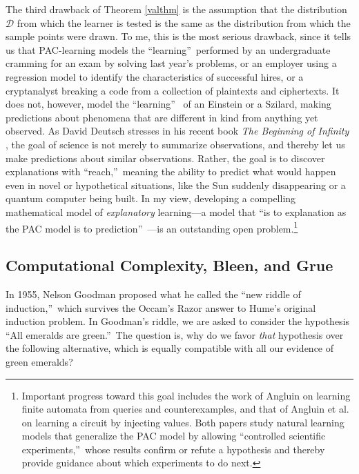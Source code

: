 \documentclass[12pt,onecolumn]{article}%
\begin{document}
The third drawback of Theorem \ref{valthm} is the assumption that the
distribution $\mathcal{D}$ from which the learner is tested is the same as
the distribution from which the sample points were drawn. To me, this is the
most serious drawback, since it tells us that PAC-learning models the
\textquotedblleft learning\textquotedblright\  performed by an undergraduate
cramming for an exam by solving last year's problems, or an employer using a
regression model to identify the characteristics of successful hires, or a
cryptanalyst breaking a code from a collection of plaintexts and ciphertexts.
 It does not, however, model the \textquotedblleft learning\textquotedblright\ %
 of an Einstein or a Szilard, making predictions about phenomena that are
different in kind from anything yet observed. As David Deutsch stresses in
his recent book \textit{The Beginning of Infinity} \cite{deutsch:infinity},
the goal of science is not merely to summarize observations, and thereby let
us make predictions about similar observations. Rather, the goal is to
discover explanations with \textquotedblleft reach,\textquotedblright\  meaning
the ability to predict what would happen even in novel or hypothetical
situations, like the Sun suddenly disappearing or a quantum computer being
built. In my view, developing a compelling mathematical model of
\textit{explanatory} learning---a model that \textquotedblleft is to
explanation as the PAC model is to prediction\textquotedblright\ ---is an
outstanding open problem.\footnote{Important progress toward this goal
includes the work of Angluin \cite{angluin} on learning finite automata from
queries and counterexamples, and that of Angluin et al. \cite{aacw} on
learning a circuit by injecting values. Both papers study natural learning
models that generalize the PAC model by allowing \textquotedblleft controlled
scientific experiments,\textquotedblright\  whose results confirm or refute a
hypothesis and thereby provide guidance about which experiments to do next.}

\subsection{Computational Complexity, Bleen, and Grue\label{GRUE}}

In 1955, Nelson Goodman \cite{goodman} proposed what he called the
\textquotedblleft new riddle of induction,\textquotedblright\  which survives
the Occam's Razor answer to Hume's original induction problem. In Goodman's
riddle, we are asked to consider the hypothesis \textquotedblleft All emeralds
are green.\textquotedblright\  The question is, why do we favor \textit{that}
hypothesis over the following alternative, which is equally compatible with
all our evidence of green emeralds?
\end{document}
